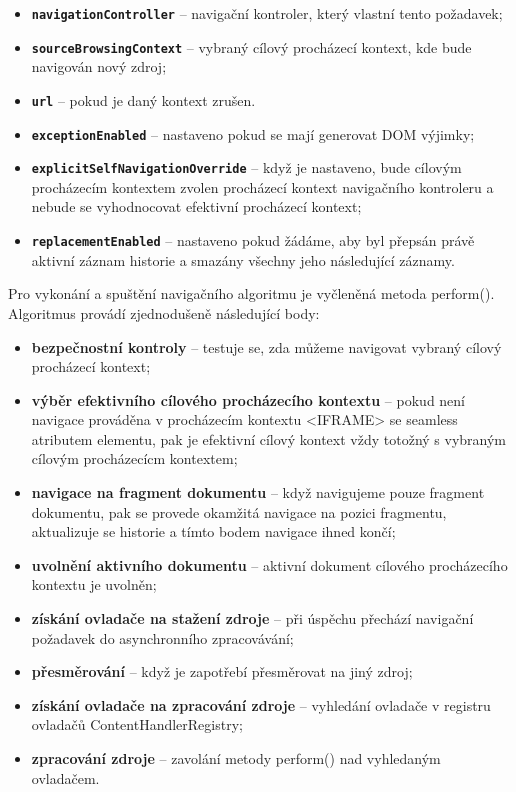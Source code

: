 \begin{itemize}
  \item \textbf{\texttt{navigationController}} -- navigační kontroler, který vlastní tento požadavek;
  \item \textbf{\texttt{sourceBrowsingContext}} -- vybraný cílový procházecí kontext, kde bude navigován nový zdroj;
  \item \textbf{\texttt{url}} -- pokud je daný kontext zrušen. 
  \item \textbf{\texttt{exceptionEnabled}} -- nastaveno pokud se mají generovat DOM výjimky;
  \item \textbf{\texttt{explicitSelfNavigationOverride}} -- když je nastaveno, bude cílovým procházecím kontextem zvolen procházecí kontext navigačního kontroleru a nebude se vyhodnocovat efektivní procházecí kontext;
  \item \textbf{\texttt{replacementEnabled}} -- nastaveno pokud žádáme, aby byl přepsán právě aktivní záznam historie a smazány všechny jeho následující záznamy.
\end{itemize}

Pro vykonání a spuštění navigačního algoritmu je vyčleněná metoda perform(). Algoritmus provádí zjednodušeně následující body:

\begin{itemize}
  \item \textbf{bezpečnostní kontroly} -- testuje se, zda můžeme navigovat vybraný cílový procházecí kontext;
  \item \textbf{výběr efektivního cílového procházecího kontextu} -- pokud není navigace prováděna v procházecím kontextu <IFRAME> se seamless atributem elementu, pak je efektivní cílový kontext vždy totožný s vybraným cílovým procházecícm kontextem;
  \item \textbf{navigace na fragment dokumentu} -- když navigujeme pouze fragment dokumentu, pak se provede okamžitá navigace na pozici fragmentu, aktualizuje se historie a tímto bodem navigace ihned končí; 
  \item \textbf{uvolnění aktivního dokumentu} -- aktivní dokument cílového procházecího kontextu je uvolněn;
  \item \textbf{získání ovladače na stažení zdroje} -- při úspěchu přechází navigační požadavek do asynchronního zpracovávání;
  \item \textbf{přesměrování} -- když je zapotřebí přesměrovat na jiný zdroj;
  \item \textbf{získání ovladače na zpracování zdroje} -- vyhledání ovladače v registru ovladačů ContentHandlerRegistry; 
  \item \textbf{zpracování zdroje} -- zavolání metody perform() nad vyhledaným ovladačem.
\end{itemize}


